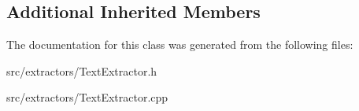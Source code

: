 \subsection*{Additional Inherited Members}


The documentation for this class was generated from the following files\+:\begin{DoxyCompactItemize}
\item 
src/extractors/Text\+Extractor.\+h\item 
src/extractors/Text\+Extractor.\+cpp\end{DoxyCompactItemize}

